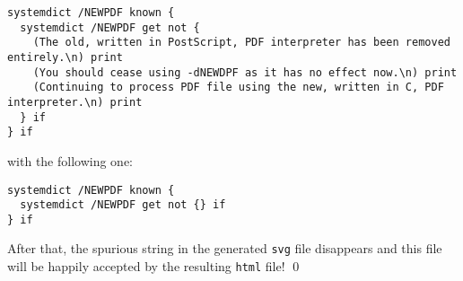 \documentclass{article}
\begin{document}
\begin{verbatim}
systemdict /NEWPDF known {
  systemdict /NEWPDF get not {
    (The old, written in PostScript, PDF interpreter has been removed entirely.\n) print
    (You should cease using -dNEWDPF as it has no effect now.\n) print
    (Continuing to process PDF file using the new, written in C, PDF interpreter.\n) print
  } if
} if
\end{verbatim}
with the following one:

\begin{verbatim}
systemdict /NEWPDF known {
  systemdict /NEWPDF get not {} if
} if
\end{verbatim}


After that, the spurious string in the generated \texttt{svg} file disappears
and this file will be happily accepted by the resulting \texttt{html} file!
\qed


\newcommand{\BibAnnote}[1]{}%


\end{document}
